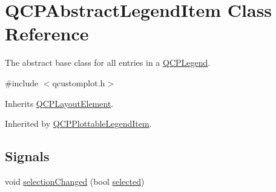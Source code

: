 \hypertarget{class_q_c_p_abstract_legend_item}{\section{Q\-C\-P\-Abstract\-Legend\-Item Class Reference}
\label{class_q_c_p_abstract_legend_item}
}


The abstract base class for all entries in a \hyperlink{class_q_c_p_legend}{Q\-C\-P\-Legend}.  




{\ttfamily \#include $<$qcustomplot.\-h$>$}



Inherits \hyperlink{class_q_c_p_layout_element}{Q\-C\-P\-Layout\-Element}.



Inherited by \hyperlink{class_q_c_p_plottable_legend_item}{Q\-C\-P\-Plottable\-Legend\-Item}.

\subsection*{Signals}
\begin{DoxyCompactItemize}
\item 
void \hyperlink{class_q_c_p_abstract_legend_item_a7cb61fdfbaf69c590bacb8f9e7099d9e}{selection\-Changed} (bool \hyperlink{class_q_c_p_abstract_legend_item_ac776e68e3367704452131c6aa9908bb9}{selected})
\end{DoxyCompactItemize}
